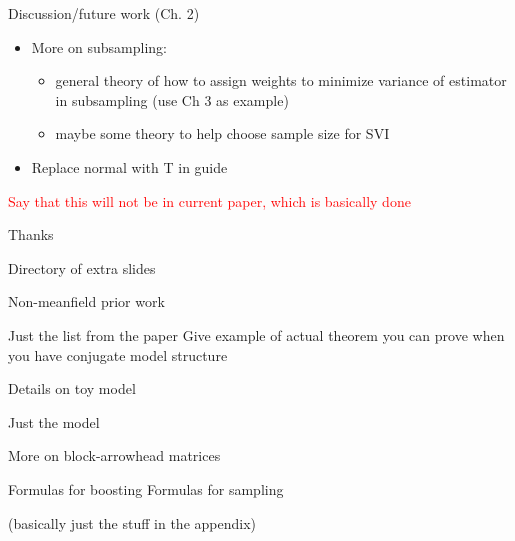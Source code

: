 \documentclass[
  ignorenonframetext,
]{beamer}
\providecommand{\tightlist}{%
  \setlength{\itemsep}{0pt}\setlength{\parskip}{0pt}}
\begin{document}
\begin{frame}{Discussion/future work (Ch. 2)}
\protect\hypertarget{discussionfuture-work-ch.-2}{}

\begin{itemize}
\item
  More on subsampling:

  \begin{itemize}
  \tightlist
  \item
    general theory of how to assign weights to minimize variance of
    estimator in subsampling (use Ch 3 as example)
  \item
    maybe some theory to help choose sample size for SVI
  \end{itemize}
\item
  Replace normal with T in guide
\end{itemize}

\textcolor{red}{{\scriptsize Say that this will not be in current paper, which is basically done}}

\end{frame}

\begin{frame}{Thanks}
\protect\hypertarget{thanks}{}

\end{frame}

\begin{frame}{Directory of extra slides}
\protect\hypertarget{directory-of-extra-slides}{}

\end{frame}

\begin{frame}{Non-meanfield prior work}
\protect\hypertarget{non-meanfield-prior-work}{}

Just the list from the paper Give example of actual theorem you can
prove when you have conjugate model structure

\end{frame}

\begin{frame}{Details on toy model}
\protect\hypertarget{details-on-toy-model}{}

Just the model

\end{frame}

\begin{frame}{More on block-arrowhead matrices}
\protect\hypertarget{more-on-block-arrowhead-matrices}{}

Formulas for boosting Formulas for sampling

(basically just the stuff in the appendix)

\end{frame}
\end{document}
